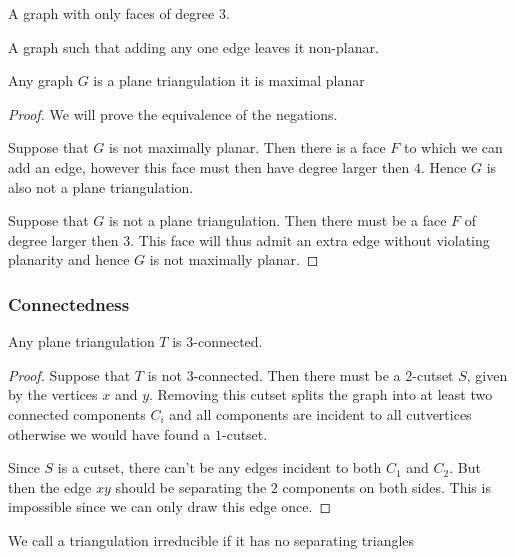 \begin{defi} 
A graph with only faces of degree $3$.
\end{defi}


\begin{defi} 
A graph such that adding any one edge leaves it non-planar.
\end{defi}

\begin{thrm}
Any graph $G$ is a plane triangulation \ifftext it is maximal planar
\end{thrm}

\begin{proof}
We will prove the equivalence of the negations.

Suppose that $G$ is not maximally planar. Then there is a face $F$ to which we can add an edge, however this face must then have degree larger then $4$. Hence $G$ is also not a plane triangulation.

Suppose that $G$ is not a plane triangulation. Then there must be a face $F$ of degree larger then $3$. This face will thus admit an extra edge without violating planarity and hence $G$ is not maximally planar.
\end{proof}

\subsubsection{Connectedness}
\begin{thrm}
Any plane triangulation $T$ is $3$-connected.
\label{th:plTri3Connected}
\end{thrm}

\begin{proof}
Suppose that $T$ is not $3$-connected. Then there must be a $2$-cutset $S$, given by the vertices $x$ and $y$. Removing this cutset splits the graph into at least two connected components $C_i$ and all components are incident to all cutvertices otherwise we would have found a $1$-cutset.

Since $S$ is a cutset, there can't be any edges incident to both $C_1$ and $C_2$. But then the edge $xy$ should be separating the $2$ components on both sides. This is impossible since we can only draw this edge once. %
\end{proof}

\begin{defi}
We call a triangulation irreducible if it has no separating triangles
\end{defi}

